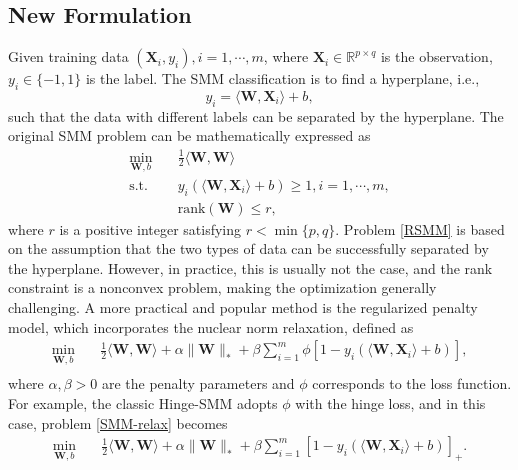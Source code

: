 \documentclass[sn-mathphys]{JORSC-jnl}%
\theoremstyle{thmstyleone}%
\theoremstyle{thmstylethree}%
\theoremstyle{thmstyleone} %
\begin{document}
\subsection{New Formulation}
Given training data $(\mathbf{X}_i, y_i), i = 1,\cdots, m$, where $\mathbf{X}_i\mathbf\in\mathbb{R}^{p\times q}$ is the observation, $y_i\in \{-1 , 1\}$ is the label. The SMM classification is to find a hyperplane, i.e.,
\begin{equation*}
y_i = \langle \mathbf{W},\mathbf {X}_i\rangle+b,
\end{equation*}
such that the data with different labels can be separated by the hyperplane. The original SMM problem can be mathematically expressed as
\begin{equation}\label{RSMM}
\begin{aligned}
\min\limits_{\mathbf{W},b}\quad
 &\frac{1}{2}\langle\mathbf{W},\mathbf{W}\rangle \\
		\text{s.t.} \quad& y_i(\langle \mathbf{W},\mathbf {X}_i\rangle+b)\geq 1, i=1,\cdots, m,\\
		 & \text{rank}(\mathbf{W}) \leq r,
\end{aligned}
\end{equation}
where $r$ is a positive integer satisfying $r<\min\{p,q\}$. Problem \eqref{RSMM} is based on the assumption that the two types of data can be successfully separated by the hyperplane. However, in practice, this is usually not the case, and the rank constraint is a nonconvex problem, making the optimization generally challenging.  A more practical and popular method is the regularized penalty model, which incorporates the nuclear norm relaxation, defined as
\begin{equation}\label{SMM-relax}
\begin{aligned}
\min_{\mathbf{W}, b} \quad
& \frac{1}{2}\langle\mathbf{W},\mathbf{W}\rangle  + \alpha \|\mathbf{W}\|_* + \beta\sum\limits_{i=1}^m \phi\left[1-y_i(\langle \mathbf W,\mathbf X_i\rangle+b)\right],\\
\end{aligned}
\end{equation}
where $\alpha, \beta > 0$ are the penalty parameters and $\phi$ corresponds to the loss function. For example, the classic Hinge-SMM \cite{luo2015support} adopts $\phi$ with the hinge loss, and in this case, problem \eqref{SMM-relax}  becomes
\begin{equation*}
\begin{aligned}
\min_{\mathbf{W}, b} \quad
&\frac{1}{2}\langle\mathbf{W},\mathbf{W}\rangle  + \alpha \|\mathbf{W}\|_* + \beta\sum\limits_{i=1}^m \left[1-y_i(\langle \mathbf W,\mathbf X_i\rangle+b)\right]_+.\\
\end{aligned}
\end{equation*}
\end{document}
